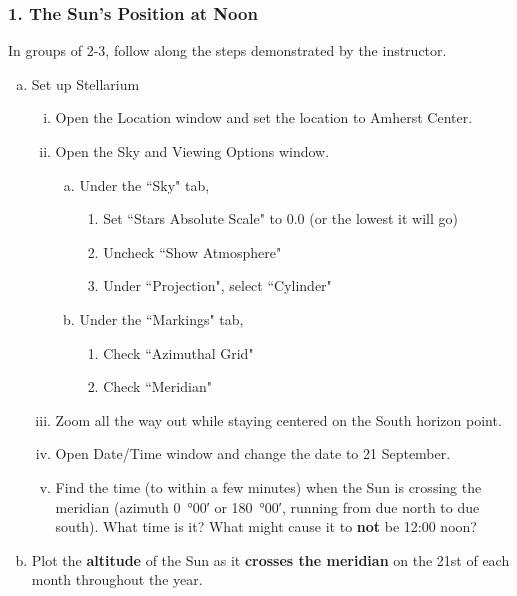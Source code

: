 \documentclass[main.tex]{subfiles}
\begin{document}
\subsubsection*{1. The Sun's Position at Noon}
In groups of 2-3, follow along the steps demonstrated by the instructor.
\begin{enumerate}[a.]
\item Set up Stellarium
	\begin{enumerate}[i.]
	\item Open the Location window and set the location to Amherst Center.
	\item Open the Sky and Viewing Options window.
		\begin{enumerate}[a)]
		\item Under the ``Sky" tab,
			\begin{enumerate}[1)]
			\item Set ``Stars Absolute Scale" to 0.0 (or the lowest it will go)
			\item Uncheck ``Show Atmosphere"
			\item Under ``Projection", select ``Cylinder"
			\end{enumerate}
		\item Under the ``Markings" tab,
			\begin{enumerate}[1)]
			\item Check ``Azimuthal Grid"
			\item Check ``Meridian"
			\end{enumerate}
		\end{enumerate}
	\item Zoom all the way out while staying centered on the South horizon point.
	\item Open Date/Time window and change the date to 21 September.
	\item Find the time (to within a few minutes) when the Sun is crossing the meridian (azimuth \SI{0}{\degree}00\si{\arcminute} or \SI{180}{\degree}00\si{\arcminute}, running from due north to due south). What time is it? What might cause it to \textbf{not} be 12:00 noon?
	\end{enumerate}

\item Plot the \textbf{altitude} of the Sun as it \textbf{crosses the meridian} on the 21st of each month throughout the year.
\end{enumerate}
\end{document}

